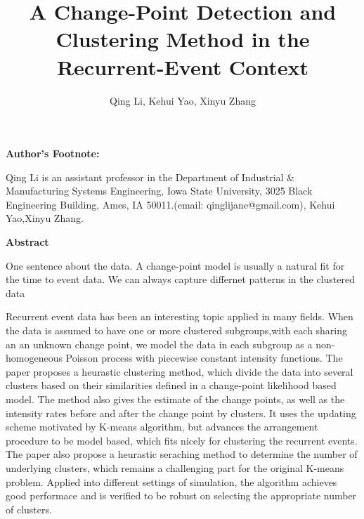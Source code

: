 \documentclass[12pt]{article}
\begin{document}

\title{A Change-Point Detection and Clustering Method in the Recurrent-Event Context}
\author{Qing Li, Kehui Yao, Xinyu Zhang}
\date{}
\maketitle
\newpage
\mbox{} \vspace*{2in}
\begin{center}
\textbf{Author's Footnote:}
\end{center}
Qing Li is an assistant professor in the Department of Industrial \& Manufacturing Systems Engineering, Iowa State University, 3025 Black Engineering Building, Ames, IA 50011.(email: qinglijane@gmail.com), Kehui Yao,Xinyu Zhang.




\newpage

\begin{center}
\textbf{Abstract}

\end{center}
One sentence about the data. A change-point model is usually a natural fit for the time to event data. We can always capture differnet patterns in the clustered data


Recurrent event data has been an interesting topic applied in many fields. When the data is assumed to have one or more clustered subgroups,with each sharing an an unknown change point, we model the data in each subgroup as a non-homogeneous Poisson process with piecewise constant intensity functions. The paper proposes a heurastic clustering method, which divide the data into several clusters based on their similarities defined in a change-point likelihood based model. The method also gives the estimate of the change points, as well as the intensity rates before and after the change point by clusters. It uses the updating scheme motivated by K-means algorithm, but advances the arrangement procedure to be model based, which fits nicely for clustering the recurrent events. The paper also propose a heurastic seraching method to determine the number of underlying clusters, which remains a challenging part for the original K-means problem. Applied into different settings of simulation, the algorithm achieves good performace and is verified to be robust on selecting the appropriate number of clusters. 

\vspace*{.3in}
\end{document}
